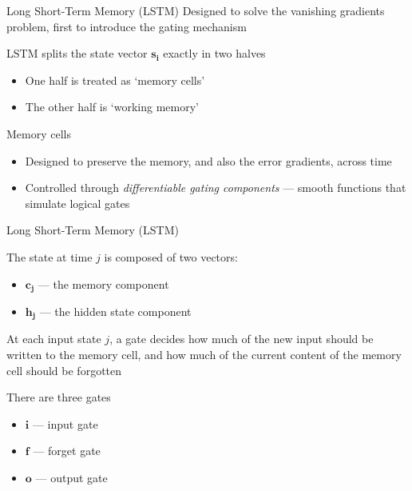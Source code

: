 \documentclass[12pt,aspectratio=169,handout]{beamer}
\begin{document}
	\begin{frame}{Long Short-Term Memory (LSTM)}
		Designed to solve the vanishing gradients problem, first to introduce the gating mechanism
		
		\pause
		LSTM splits the state vector $\bm{s_i}$ exactly in two halves
		\begin{itemize}
			\item One half is treated as `memory cells'
			\item The other half is `working memory'
		\end{itemize}
		
		\pause
		\begin{block}{Memory cells}
			\begin{itemize}
				\item Designed to preserve the memory, and also the error gradients, across time
				\item Controlled through \emph{differentiable gating components} --- smooth functions that simulate logical gates
			\end{itemize}
		\end{block}
		
		
	\end{frame}
	
	\begin{frame}{Long Short-Term Memory (LSTM)}
		
		The state at time $j$ is composed of two vectors:
		\begin{itemize}
			\item $\bm{c_j}$ --- the memory component
			\item $\bm{h_j}$ --- the hidden state component
		\end{itemize}
		
		\pause
		At each input state $j$, a gate decides how much of the new input should be written to the memory cell, and how much of the current content of the memory cell should be forgotten
		
		\pause
		There are three gates
		\begin{itemize}
			\item $\bm{i}$ --- input gate
			\item $\bm{f}$ --- forget gate
			\item $\bm{o}$ --- output gate
		\end{itemize}
		
		
	\end{frame}
	
\end{document}

